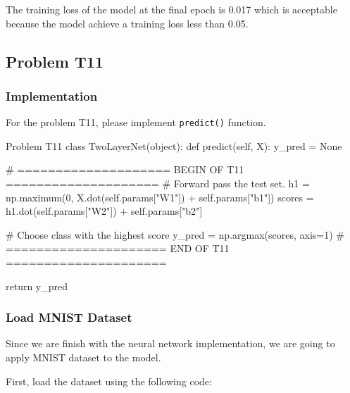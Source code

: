 \documentclass[12pt, a4paper]{article}
\begin{document}
                The training loss of the model at the final epoch is 0.017 which is acceptable because the model achieve a training loss less than 0.05.

    \pagebreak

        \subsection{Problem T11}
            \subsubsection{Implementation}
                For the problem T11, please implement \texttt{predict()} function.

                \begin{codeblock}{Problem T11}
                    class TwoLayerNet(object):
                        def predict(self, X):
                            y_pred = None

                            # ==================== BEGIN OF T11 ====================
                            # Forward pass the test set.
                            h1 = np.maximum(0, X.dot(self.params["W1"]) + self.params["b1"])
                            scores = h1.dot(self.params["W2"]) + self.params["b2"]

                            # Choose class with the highest score
                            y_pred = np.argmax(scores, axis=1)
                            # ===================== END OF T11 =====================

                            return y_pred
                \end{codeblock}
            
            \subsubsection{Load MNIST Dataset}
                Since we are finish with the neural network implementation, we are going to apply MNIST dataset to the model.

                First, load the dataset using the following code:
\end{document}
